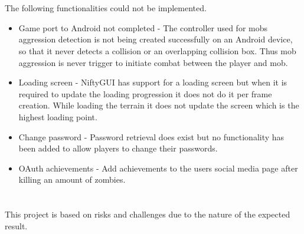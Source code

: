 \documentclass[letterpaper]{article}
\begin{document}
	\section*{\colorbox{black}{}} 
		\vspace{0.1in}
		
		The following functionalities could not be implemented.
		\begin{itemize}
			\item Game port to Android not completed - The controller used for mobs aggression detection is not being created successfully on an Android device, so that it never detects a collision or an overlapping collision box. Thus mob aggression is never trigger to initiate combat between the player and mob.
			\item Loading screen - NiftyGUI has support for a loading screen but when it is required to update the loading progression it does not do it per frame creation. While loading the terrain it does not update the screen which is the highest loading point.
			\item Change password - Password retrieval does exist but no functionality has been added to allow players to change their passwords.
			\item OAuth achievements - Add achievements to the users social media page after killing an amount of zombies.
		\end{itemize}
		
		\vspace{0.2in}
	\section*{\colorbox{black}{}} 
		\vspace{0.1in}
		
		This project is based on risks and challenges due to the nature of the expected result.
		
\end{document}
